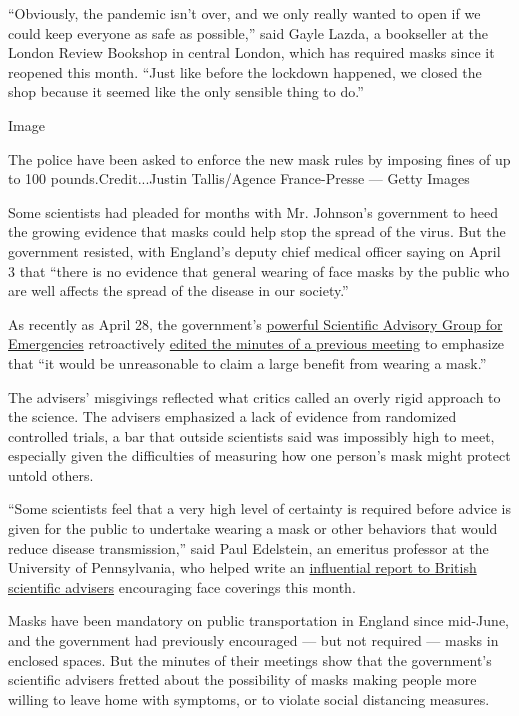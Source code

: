 ``Obviously, the pandemic isn't over, and we only really wanted to open
if we could keep everyone as safe as possible,'' said Gayle Lazda, a
bookseller at the London Review Bookshop in central London, which has
required masks since it reopened this month. ``Just like before the
lockdown happened, we closed the shop because it seemed like the only
sensible thing to do.''

Image

The police have been asked to enforce the new mask rules by imposing
fines of up to 100 pounds.Credit...Justin Tallis/Agence France-Presse
--- Getty Images

Some scientists had pleaded for months with Mr. Johnson's government to
heed the growing evidence that masks could help stop the spread of the
virus. But the government resisted, with England's deputy chief medical
officer saying on April 3 that ``there is no evidence that general
wearing of face masks by the public who are well affects the spread of
the disease in our society.''

As recently as April 28, the government's
\href{https://www.nytimes.com/2020/04/23/world/europe/uk-coronavirus-sage-secret.html}{powerful
Scientific Advisory Group for Emergencies} retroactively
\href{https://assets.publishing.service.gov.uk/government/uploads/system/uploads/attachment_data/file/888802/S0398_Twenty-ninth_SAGE_meeting_on_Covid-19_.pdf}{edited
the minutes of a previous meeting} to emphasize that ``it would be
unreasonable to claim a large benefit from wearing a mask.''

The advisers' misgivings reflected what critics called an overly rigid
approach to the science. The advisers emphasized a lack of evidence from
randomized controlled trials, a bar that outside scientists said was
impossibly high to meet, especially given the difficulties of measuring
how one person's mask might protect untold others.

``Some scientists feel that a very high level of certainty is required
before advice is given for the public to undertake wearing a mask or
other behaviors that would reduce disease transmission,'' said Paul
Edelstein, an emeritus professor at the University of Pennsylvania, who
helped write an
\href{https://rs-delve.github.io/addenda/2020/07/07/masks-update.html}{influential
report to British scientific advisers} encouraging face coverings this
month.

Masks have been mandatory on public transportation in England since
mid-June, and the government had previously encouraged --- but not
required --- masks in enclosed spaces. But the minutes of their meetings
show that the government's scientific advisers fretted about the
possibility of masks making people more willing to leave home with
symptoms, or to violate social distancing measures.

